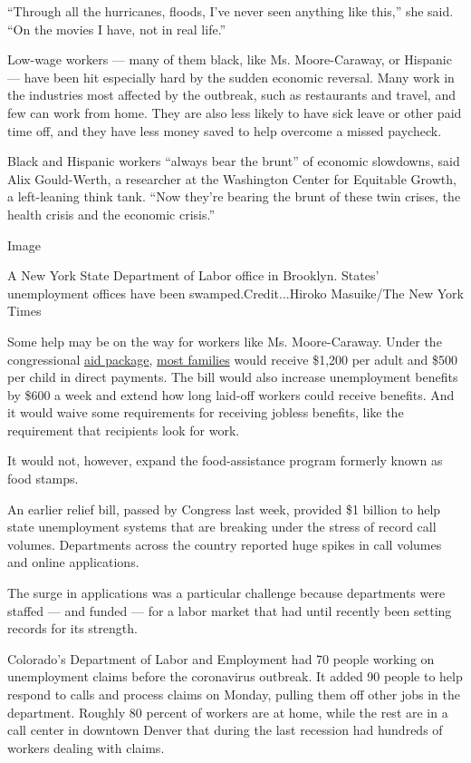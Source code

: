 ``Through all the hurricanes, floods, I've never seen anything like
this,'' she said. ``On the movies I have, not in real life.''

Low-wage workers --- many of them black, like Ms. Moore-Caraway, or
Hispanic --- have been hit especially hard by the sudden economic
reversal. Many work in the industries most affected by the outbreak,
such as restaurants and travel, and few can work from home. They are
also less likely to have sick leave or other paid time off, and they
have less money saved to help overcome a missed paycheck.

Black and Hispanic workers ``always bear the brunt'' of economic
slowdowns, said Alix Gould-Werth, a researcher at the Washington Center
for Equitable Growth, a left-leaning think tank. ``Now they're bearing
the brunt of these twin crises, the health crisis and the economic
crisis.''

Image

A New York State Department of Labor office in Brooklyn. States'
unemployment offices have been swamped.Credit...Hiroko Masuike/The New
York Times

Some help may be on the way for workers like Ms. Moore-Caraway. Under
the congressional
\href{https://www.nytimes3xbfgragh.onion/2020/03/25/us/politics/whats-in-coronavirus-stimulus-bill.html?action=click\&module=Spotlight\&pgtype=Homepage}{aid
package},
\href{https://www.nytimes3xbfgragh.onion/article/coronavirus-stimulus-package-questions-answers.html}{most
families} would receive \$1,200 per adult and \$500 per child in direct
payments. The bill would also increase unemployment benefits by \$600 a
week and extend how long laid-off workers could receive benefits. And it
would waive some requirements for receiving jobless benefits, like the
requirement that recipients look for work.

It would not, however, expand the food-assistance program formerly known
as food stamps.

An earlier relief bill, passed by Congress last week, provided \$1
billion to help state unemployment systems that are breaking under the
stress of record call volumes. Departments across the country reported
huge spikes in call volumes and online applications.

The surge in applications was a particular challenge because departments
were staffed --- and funded --- for a labor market that had until
recently been setting records for its strength.

Colorado's Department of Labor and Employment had 70 people working on
unemployment claims before the coronavirus outbreak. It added 90 people
to help respond to calls and process claims on Monday, pulling them off
other jobs in the department. Roughly 80 percent of workers are at home,
while the rest are in a call center in downtown Denver that during the
last recession had hundreds of workers dealing with claims.

